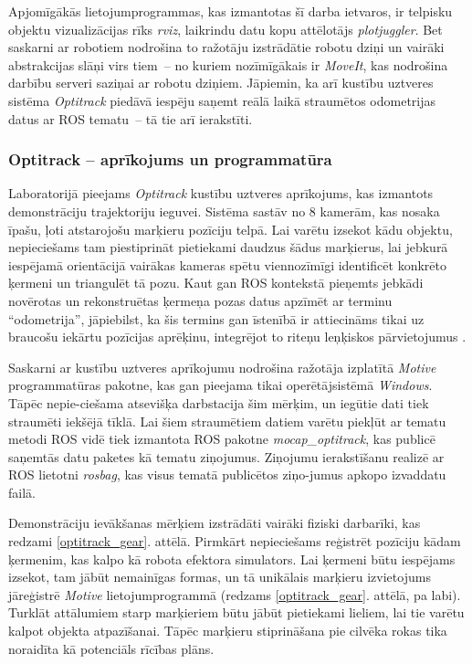 \documentclass[12pt, a4paper]{article}
\numberwithin{equation}{section} %
\begin{document}
Apjomīgākās lietojumprogrammas, kas izmantotas šī darba ietvaros, ir telpisku objektu vizualizācijas rīks \textit{rviz}, laikrindu datu kopu attēlotājs \textit{plotjuggler}. Bet saskarni ar robotiem nodrošina to ražotāju izstrādātie robotu dziņi un vairāki abstrakcijas slāņi virs tiem~-- no kuriem nozīmīgākais ir \textit{MoveIt}, kas nodrošina darbību serveri saziņai ar robotu dziņiem. Jāpiemin, ka arī kustību uztveres sistēma \textit{Optitrack} piedāvā iespēju saņemt reālā laikā straumētos odometrijas datus ar ROS tematu~-- tā tie arī ierakstīti.

\subsubsection{Optitrack -- aprīkojums un programmatūra}

Laboratorijā pieejams \textit{Optitrack} kustību uztveres aprīkojums, kas izmantots demonstrāciju trajektoriju ieguvei. Sistēma sastāv no 8 kamerām, kas nosaka īpašu, ļoti atstarojošu marķieru pozīciju telpā. Lai varētu izsekot kādu objektu, nepieciešams tam piestiprināt pietiekami daudzus šādus marķierus, lai jebkurā iespējamā orientācijā vairākas kameras spētu viennozīmīgi identificēt konkrēto ķermeni un triangulēt tā pozu. Kaut gan ROS kontekstā pieņemts jebkādi novērotas un rekonstruētas ķermeņa pozas datus apzīmēt ar terminu ``odometrija'', jāpiebilst, ka šis termins gan īstenībā ir attiecināms tikai uz braucošu iekārtu pozīcijas aprēķinu, integrējot to riteņu leņķiskos pārvietojumus \cite{odometry}.

Saskarni ar kustību uztveres aprīkojumu nodrošina ražotāja izplatītā \textit{Motive} programmatūras pakotne, kas gan pieejama tikai operētājsistēmā \textit{Windows}. Tāpēc nepie-ciešama atsevišķa darbstacija šim mērķim, un iegūtie dati tiek straumēti iekšējā tīklā. Lai šiem straumētiem datiem varētu piekļūt ar tematu metodi ROS vidē tiek izmantota ROS pakotne \textit{mocap\_optitrack}, kas publicē saņemtās datu paketes kā tematu ziņojumus. Ziņojumu ierakstīšanu realizē ar ROS lietotni \textit{rosbag}, kas visus tematā publicētos ziņo-jumus apkopo izvaddatu failā.

Demonstrāciju ievākšanas mērķiem izstrādāti vairāki fiziski darbarīki, kas redzami \ref{optitrack_gear}. attēlā. Pirmkārt nepieciešams reģistrēt pozīciju kādam ķermenim, kas kalpo kā robota efektora simulators. Lai ķermeni būtu iespējams izsekot, tam jābūt nemainīgas formas, un tā unikālais marķieru izvietojums jāreģistrē \textit{Motive} lietojumprogrammā (redzams \ref{optitrack_gear}. attēlā, pa labi). Turklāt attālumiem starp marķieriem būtu jābūt pietiekami lieliem, lai tie varētu kalpot objekta atpazīšanai. Tāpēc marķieru stiprināšana pie cilvēka rokas tika noraidīta kā potenciāls rīcības plāns. 
\end{document}
